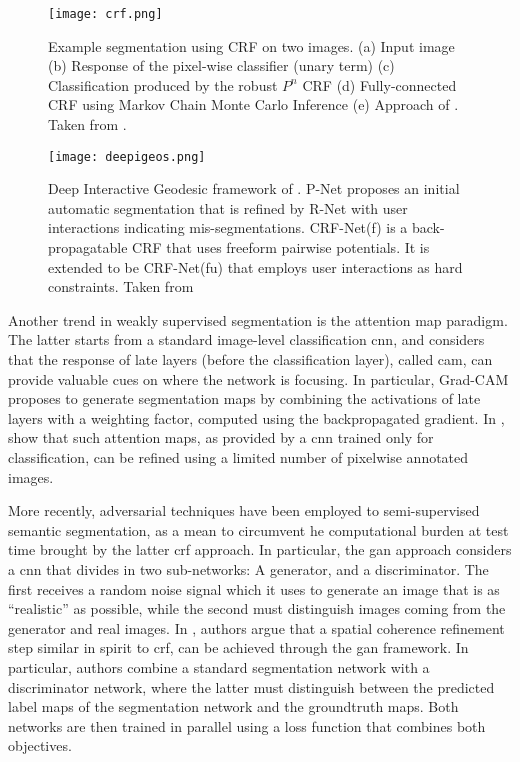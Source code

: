 \begin{figure}[!h]
  \centering
  \texttt{[image: crf.png]}
  \caption{Example segmentation using CRF on two images. (a) Input image (b) Response of the pixel-wise classifier (unary term) (c) Classification produced by the robust $P^{n}$ CRF \cite{kohli09} (d) Fully-connected CRF using Markov Chain Monte Carlo Inference (e) Approach of \cite{krahenbuhl11}. Taken from \cite{krahenbuhl11}.}
  \label{fig:crf}
\end{figure}

\begin{figure}[!h]
  \centering
  \texttt{[image: deepigeos.png]}
  \caption{Deep Interactive Geodesic framework of \cite{wang18}. P-Net proposes an initial automatic segmentation that is refined by R-Net with user interactions indicating mis-segmentations. CRF-Net(f) is a
    back-propagatable CRF that uses freeform pairwise potentials.
    It is extended to be CRF-Net(fu) that employs user interactions as hard constraints. Taken from \cite{wang18}}
  \label{fig:deepigeos}
\end{figure}

Another trend in weakly supervised segmentation is the attention map paradigm.
The latter starts from a standard image-level classification \gls{cnn}, and considers that the response of late layers (before the classification layer), called \gls{cam}, can provide valuable cues on where the network is focusing.
In particular, Grad-CAM \cite{selvaraju17} proposes to generate segmentation maps by combining the activations of late layers with a weighting factor, computed using the backpropagated gradient.
In \cite{li18}, show that such attention maps, as provided by a \gls{cnn} trained only for classification, can be refined using a limited number of pixelwise annotated images.

More recently, adversarial techniques have been employed to semi-supervised semantic segmentation, as a mean to circumvent he computational burden at test time brought by the latter \gls{crf} approach.
In particular, the \gls{gan} approach \cite{goodfellow14} considers a \gls{cnn} that divides in two sub-networks: A generator, and a discriminator.
The first receives a random noise signal which it uses to generate an image that is as ``realistic'' as possible, while the second must distinguish images coming from the generator and real images.
In \cite{luc16}, authors argue that a spatial coherence refinement step similar in spirit to \gls{crf}, can be achieved through the \gls{gan} framework.
In particular, authors combine a standard segmentation network with a discriminator network,
where the latter must distinguish between the predicted label maps of the segmentation network and the groundtruth maps.
Both networks are then trained in parallel using a loss function that combines both objectives.


